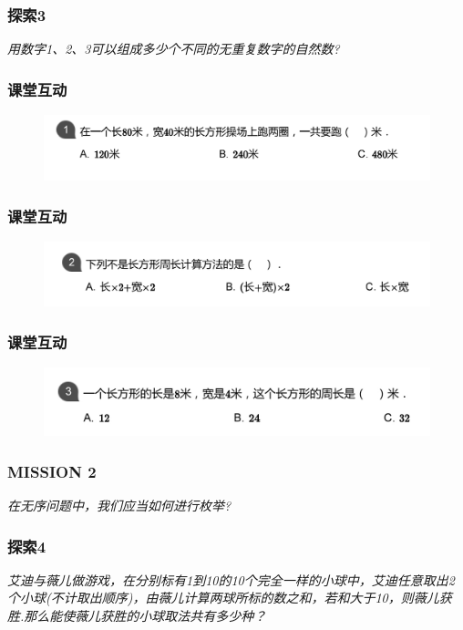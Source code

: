 \begin{frame}
    \frametitle{探索3}
    \textit{用数字1、2、3可以组成多少个不同的无重复数字的自然数?}
\end{frame}

\begin{frame}
    \frametitle{课堂互动}
    \begin{figure}[H] 
        \centering
        \includegraphics[width=1\textwidth]{./pics/Chapter_1/kthd1.png}
    \end{figure}
\end{frame}

\begin{frame}
    \frametitle{课堂互动}
    \begin{figure}[H] 
        \centering
        \includegraphics[width=1\textwidth]{./pics/Chapter_1/kthd2.png}
    \end{figure}
\end{frame}

\begin{frame}
    \frametitle{课堂互动}
    \begin{figure}[H] 
        \centering
        \includegraphics[width=1\textwidth]{./pics/Chapter_1/kthd3.png}
    \end{figure}
\end{frame}

\begin{frame}
    \frametitle{MISSION 2}
    \textit{在无序问题中，我们应当如何进行枚举?}
\end{frame}

\begin{frame}
    \frametitle{探索4}
    \textit{艾迪与薇儿做游戏，在分别标有1到10的10个完全一样的小球中，艾迪任意取出2个小球(不计取出顺序)，由薇儿计算两球所标的数之和，若和大于10，则薇儿获胜.那么能使薇儿获胜的小球取法共有多少种？}
\end{frame}

